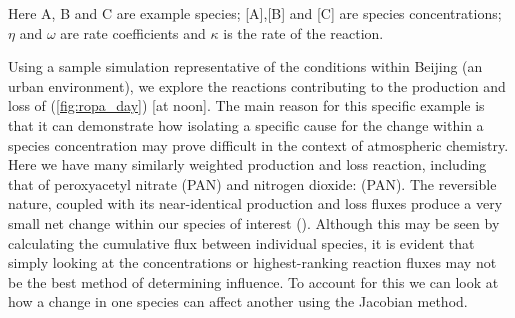 Here A, B and C are example species; [A],[B] and [C] are species concentrations; $\eta$ and $\omega$ are rate coefficients and $\kappa$ is the rate of the reaction.  

Using a sample simulation representative of the conditions within Beijing (an urban environment), we explore the reactions contributing to the production and loss of 
(\autoref{fig:ropa_day}) [at noon]. The main reason for this specific example is that it can demonstrate how isolating a specific cause for the change within a species concentration may prove difficult in the context of atmospheric chemistry. Here we have many similarly weighted production and loss reaction, including that of peroxyacetyl nitrate (PAN) and nitrogen dioxide: 
 (PAN). The reversible nature, coupled with its near-identical production and loss fluxes produce a very small net change within our species of interest (). Although this may be seen by calculating the cumulative flux between individual species, it is evident that simply looking at the concentrations or highest-ranking reaction fluxes may not be the best method of determining influence. To account for this we can look at how a change in one species can affect another using the Jacobian method.



